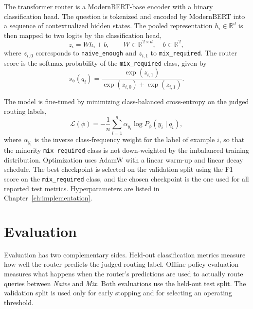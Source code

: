 \documentclass[english, bibtex]{kththesis}               %
\numberwithin{listing}{chapter}
\begin{document}
The transformer router is a ModernBERT-base \cite{warner2024modernbert} encoder with a binary classification head. The question is tokenized and encoded by ModernBERT into a sequence of contextualized hidden states. The pooled representation \(h_i \in \mathbb{R}^{d}\) is then mapped to two logits by the classification head,
\begin{equation}
\label{eq:modernBertLogits}
z_i = W h_i + b,
\qquad
W \in \mathbb{R}^{2 \times d}, \quad b \in \mathbb{R}^{2},
\end{equation}
where \(z_{i,0}\) corresponds to \texttt{naive\_enough} and \(z_{i,1}\) to \texttt{mix\_required}. The router score is the softmax probability of the \texttt{mix\_required} class, given by
\begin{equation}
\label{eq:modernBertSoftmax}
s_\phi(q_i)
=
\frac{\exp(z_{i,1})}{\exp(z_{i,0}) + \exp(z_{i,1})}.
\end{equation}

The model is fine-tuned by minimizing class-balanced cross-entropy on the judged routing labels,
\begin{equation}
\label{eq:modernBertLoss}
\mathcal{L}(\phi)
=
-\frac{1}{n}\sum_{i=1}^{n}
\alpha_{y_i} \log P_\phi(y_i \mid q_i),
\end{equation}
where \(\alpha_{y_i}\) is the inverse class-frequency weight for the label of example \(i\), so that the minority \texttt{mix\_required} class is not down-weighted by the imbalanced training distribution. Optimization uses AdamW \cite{loshchilov2019decoupled} with a linear warm-up and linear decay schedule. The best checkpoint is selected on the validation split using the F1 score on the \texttt{mix\_required} class, and the chosen checkpoint is the one used for all reported test metrics. Hyperparameters are listed in Chapter~\ref{ch:implementation}.

\section{Evaluation}
\label{sec:methodEvaluation}

Evaluation has two complementary sides. Held-out classification metrics measure how well the router predicts the judged routing label. Offline policy evaluation measures what happens when the router's predictions are used to actually route queries between \emph{Naive} and \emph{Mix}. Both evaluations use the held-out test split. The validation split is used only for early stopping and for selecting an operating threshold.
\end{document}
